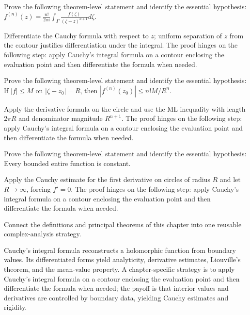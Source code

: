 \begin{problem}\label{prob:iv06-problem-09}
Prove the following theorem-level statement and identify the essential hypothesis: $f^{(n)}(z)=\frac{n!}{2\pi i}\int_\Gamma\frac{f(\zeta)}{(\zeta-z)^{n+1}}d\zeta$.
\end{problem}
\begin{solution}
Differentiate the Cauchy formula with respect to $z$; uniform separation of $z$ from the contour justifies differentiation under the integral. The proof hinges on the following step: apply Cauchy's integral formula on a contour enclosing the evaluation point and then differentiate the formula when needed.
\end{solution}

\begin{problem}\label{prob:iv06-problem-10}
Prove the following theorem-level statement and identify the essential hypothesis: If $|f|\le M$ on $|\zeta-z_0|=R$, then $|f^{(n)}(z_0)|\le n!M/R^n$.
\end{problem}
\begin{solution}
Apply the derivative formula on the circle and use the ML inequality with length $2\pi R$ and denominator magnitude $R^{n+1}$. The proof hinges on the following step: apply Cauchy's integral formula on a contour enclosing the evaluation point and then differentiate the formula when needed.
\end{solution}

\begin{problem}\label{prob:iv06-problem-11}
Prove the following theorem-level statement and identify the essential hypothesis: Every bounded entire function is constant.
\end{problem}
\begin{solution}
Apply the Cauchy estimate for the first derivative on circles of radius $R$ and let $R\to\infty$, forcing $f'=0$. The proof hinges on the following step: apply Cauchy's integral formula on a contour enclosing the evaluation point and then differentiate the formula when needed.
\end{solution}

\begin{problem}\label{prob:iv06-problem-12}
Connect the definitions and principal theorems of this chapter into one reusable complex-analysis strategy.
\end{problem}
\begin{solution}
Cauchy's integral formula reconstructs a holomorphic function from boundary values. Its differentiated forms yield analyticity, derivative estimates, Liouville's theorem, and the mean-value property. A chapter-specific strategy is to apply Cauchy's integral formula on a contour enclosing the evaluation point and then differentiate the formula when needed; the payoff is that interior values and derivatives are controlled by boundary data, yielding Cauchy estimates and rigidity.
\end{solution}

